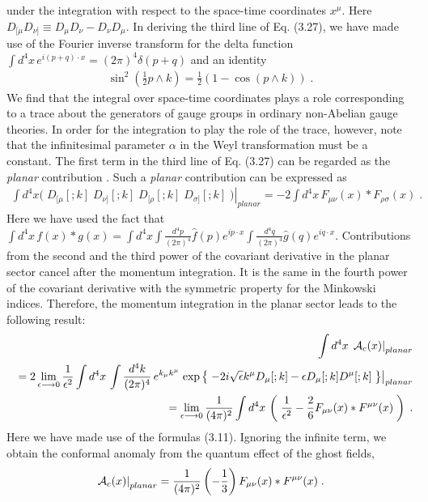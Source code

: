 \documentclass[a4paper,12pt]{article}
\begin{document}
%
under the integration with respect to the space-time coordinates 
$x^{\mu}$. Here $D_{[\mu}D_{\nu]} \equiv D_{\mu}D_{\nu}-D_{\nu}D_{\mu}$. 
In deriving the third line of Eq. (3.27), we have made use of the Fourier 
inverse transform for the delta function $\displaystyle{ \int d^{4}x \, 
e^{i(p+q) \cdot x} = (2\pi)^{4}\delta(p+q) }$ and an identity 
%
\begin{eqnarray}
\sin^{2}(\frac{1}{2} p \wedge k) = 
\frac{1}{2}(1-\cos(p \wedge k)) \;.
\end{eqnarray}
%
We find that the integral over space-time 
coordinates plays a role corresponding to a trace about the generators of 
gauge groups in ordinary non-Abelian gauge theories. In order for the 
integration to play the role of the trace, however, note that the 
infinitesimal parameter 
$\alpha$ in the Weyl transformation must be a constant. The first term in the 
third line of Eq. (3.27) can be regarded as the {\it planar} contribution 
\cite{VVKGT, AMLSNT, MMSJ}. Such a {\it planar} contribution can be 
expressed as 
%
\begin{eqnarray}
\int d^{4}x \left. \biggl(\; 
D_{[\mu}[;k] \; D_{\nu]}[;k] \; 
D_{[\rho}[;k] \; D_{\sigma]}[;k] \; \biggr) 
 \right|_{planar} 
= -2\int d^{4}x \, F_{\mu\nu}(x) \ast F_{\rho\sigma}(x) \;.
\end{eqnarray}
%
%
Here we have used the fact that $\displaystyle{\int d^{4}x \, f(x) \ast g(x) 
= \int d^{4}x  
\int \frac{d^{4}p}{(2\pi)^{4}} \hat{f}(p)e^{ip \cdot x} 
\int \frac{d^{4}q}{(2\pi)^{4}} \hat{g}(q)e^{iq \cdot x}}$. 
Contributions from the second and the third power of the covariant derivative 
in the planar sector cancel after the momentum integration. It is the same 
in the fourth power of the covariant derivative with the symmetric property 
for the Minkowski indices.  
Therefore, the momentum integration in the planar sector leads to the 
following result: 
%
%
\begin{eqnarray}
& & \int d^{4}x \, \left. {\cal A}_{c}(x) \right|_{planar} \nonumber \\
& & = 2\lim_{\epsilon \longrightarrow 0} \frac{1}{\epsilon^{2}}
\int d^{4}x \, \int \frac{d^{4}k}{(2\pi)^{4}} \,e^{k_{\mu}k^{\mu}} 
\left. \exp \left\{ \; -2i\sqrt{\epsilon}k^{\mu} D_{\mu}[;k] 
- \epsilon D_{\mu}[;k]D^{\mu}[;k] \; \right\} \right|_{planar} 
\nonumber \\ 
& & = \lim_{\epsilon \longrightarrow 0} \frac{1}{(4\pi)^{2}} 
\int d^{4}x \, \left( \; \frac{1}{\epsilon^{2}} 
 - \frac{2}{6}F_{\mu\nu}(x) \ast F^{\mu\nu}(x) \;\right) \;. 
\end{eqnarray}
%
Here we have made use of the formulas (3.11). Ignoring the infinite term, we 
obtain the conformal anomaly from the quantum effect of the ghost fields, 
%
\begin{eqnarray}
\left. {\cal A}_{c}(x) \right|_{planar} =  
\frac{1}{(4\pi)^{2}}  \left( -\frac{1}{3} \right) 
F_{\mu\nu}(x) \ast F^{\mu\nu}(x) \;.
\end{eqnarray}
%
\end{document}
